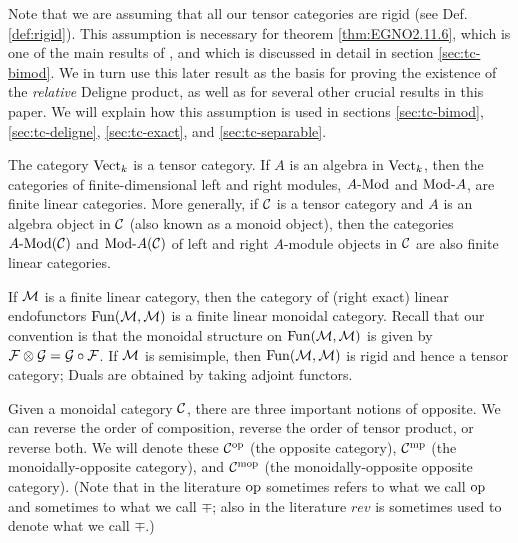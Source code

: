 \documentclass{amsart}
\begin{document}
\noindent Note that we are assuming that all our tensor categories are rigid (see Def. \ref{def:rigid}). This assumption is necessary for theorem \ref{thm:EGNO2.11.6}, which is one of the main results of \cite{EGNO}, and which is discussed in detail in section \ref{sec:tc-bimod}. We in turn use this later result as the basis for proving the existence of the {\em relative} Deligne product, as well as for several other crucial results in this paper. We will explain how this assumption is used in sections \ref{sec:tc-bimod}, \ref{sec:tc-deligne}, \ref{sec:tc-exact}, and \ref{sec:tc-separable}.

\begin{example}
	The category $\mathrm{Vect}_k$ is a tensor category. If $A$ is an algebra in $\mathrm{Vect}_k$, then the categories of finite-dimensional left and right modules, $\Mod{A}{}$ and $\Mod{}{A}$, are finite linear categories. More generally, if $\mathcal C$ is a tensor category and $A$ is an algebra object in $\mathcal C$ (also known as a monoid object), then the categories $\Mod{A}{}(\cC)$ and $\Mod{}{A}(\cC)$ of left and right $A$-module objects in $\mathcal C$ are also finite linear categories.
\end{example}

\begin{example}
	If $\mathcal M$ is a finite linear category, then the category of (right exact) linear endofunctors $\operatorname{Fun}(\mathcal M, \mathcal M)$ is a finite linear monoidal category. Recall that our convention is that the monoidal structure on $\operatorname{Fun}(\mathcal M, \mathcal M)$ is given by $\mathcal F \otimes \mathcal G = \mathcal G \circ \mathcal F$. If $\mathcal M$ is semisimple, then $\operatorname{Fun}(\mathcal M, \mathcal M)$ is rigid and hence a tensor category; Duals are obtained by taking adjoint functors.  
\end{example}

Given a monoidal category $\mathcal C$, there are three important notions of opposite. We can reverse the order of composition, reverse the order of tensor product, or reverse both.  We will denote these $\mathcal C^{\mathrm{op}}$ (the opposite category), $\mathcal C^{\mathrm{mp}}$ (the monoidally-opposite category), and $\mathcal C^{\mathrm{mop}}$ (the monoidally-opposite opposite category).  (Note that in the literature $\mathrm{op}$ sometimes refers to what we call $\mathrm{op}$ and sometimes to what we call $\mp$; also in the literature $rev$ is sometimes used to denote what we call $\mp$.)
\end{document}
